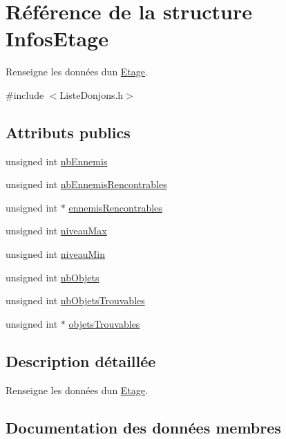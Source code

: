 \hypertarget{structInfosEtage}{}\section{Référence de la structure Infos\+Etage}
\label{structInfosEtage}


Renseigne les données d\textquotesingle{}un \mbox{\hyperlink{classEtage}{Etage}}.  




{\ttfamily \#include $<$Liste\+Donjons.\+h$>$}

\subsection*{Attributs publics}
\begin{DoxyCompactItemize}
\item 
unsigned int \mbox{\hyperlink{structInfosEtage_ad9dcebb01373d07c952586c77479d336}{nb\+Ennemis}}
\item 
unsigned int \mbox{\hyperlink{structInfosEtage_a532fd49311811ed1830828629c977316}{nb\+Ennemis\+Rencontrables}}
\item 
unsigned int $\ast$ \mbox{\hyperlink{structInfosEtage_a804074bd26d94a3b70f0a6b3572592a3}{ennemis\+Rencontrables}}
\item 
unsigned int \mbox{\hyperlink{structInfosEtage_aaf5b1d9d8f307371429529879d56e0a7}{niveau\+Max}}
\item 
unsigned int \mbox{\hyperlink{structInfosEtage_a579c406b3b58d6d68b81871680371e37}{niveau\+Min}}
\item 
unsigned int \mbox{\hyperlink{structInfosEtage_a21e0f92d5bee26ae5fce62c799768495}{nb\+Objets}}
\item 
unsigned int \mbox{\hyperlink{structInfosEtage_ac5ca4457a9300a09e643e8ca6f7ef5e9}{nb\+Objets\+Trouvables}}
\item 
unsigned int $\ast$ \mbox{\hyperlink{structInfosEtage_aed27c79c0b551c4d527ed162b6ba1352}{objets\+Trouvables}}
\end{DoxyCompactItemize}


\subsection{Description détaillée}
Renseigne les données d\textquotesingle{}un \mbox{\hyperlink{classEtage}{Etage}}. 

\subsection{Documentation des données membres}
\mbox{\label{structInfosEtage_a804074bd26d94a3b70f0a6b3572592a3}} 
